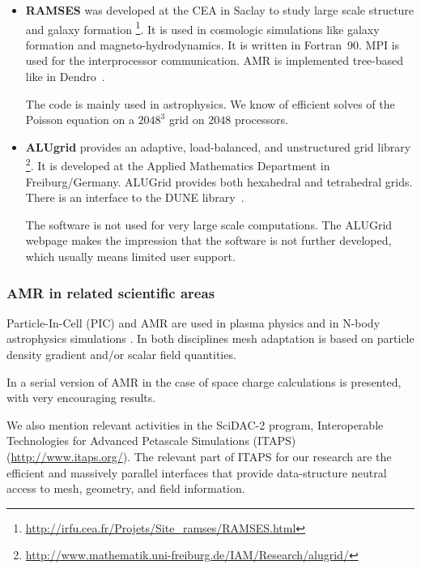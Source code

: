 \documentclass[11pt,pdftex]{article}
\begin{document}
\begin{itemize}
\item \textbf{RAMSES} was developed at the CEA in Saclay to study large
  scale structure and galaxy formation%
  \footnote{\url{http://irfu.cea.fr/Projets/Site_ramses/RAMSES.html}}.
  It is used in cosmologic simulations like galaxy formation and
  magneto-hydrodynamics.  It is written in Fortran~90.  MPI is used for
  the interprocessor communication.  AMR is implemented tree-based like
  in \textsf{Dendro}~\cite{teyssier2002}.  

  The code is mainly used in astrophysics.  We know of efficient solves
  of the Poisson equation on a $2048^3$ grid on $2048$ processors.

\item \textbf{ALUgrid} provides an adaptive, load-balanced, and
  unstructured grid library%
  \footnote{\url{http://www.mathematik.uni-freiburg.de/IAM/Research/alugrid/}}.
  It is developed at the Applied Mathematics Department in
  Freiburg/Germany.  ALUGrid provides both hexahedral and tetrahedral
  grids.  There is an interface to the DUNE library~\cite{bdko:06}.

  The software is not used for very large scale computations.  The
  ALUGrid webpage makes the impression that the software is not further
  developed, which usually means limited user support.
  
\end{itemize}

\subsubsection{AMR in related scientific areas}

Particle-In-Cell (PIC) and AMR are used in plasma physics \cite{vay:04,
  Schnepp20104075} and in N-body astrophysics simulations
\cite{Miniati2007400, 2000ApJS..131..273F, 2004astro.ph..3044O,
  teyssier2002}.  In both disciplines mesh adaptation is based on
particle density gradient and/or scalar field quantities.

In \cite{pori2008} a serial version of AMR in the case of space charge
calculations is presented, with very encouraging results.


We also mention relevant activities in the SciDAC-2 program,
Interoperable Technologies for Advanced Peta\-scale Simulations (ITAPS)
(\url{http://www.itaps.org/}).  The relevant part of ITAPS for our
research are the efficient and massively parallel interfaces that
provide data-structure neutral access to mesh, geometry, and field
information.
\end{document}
